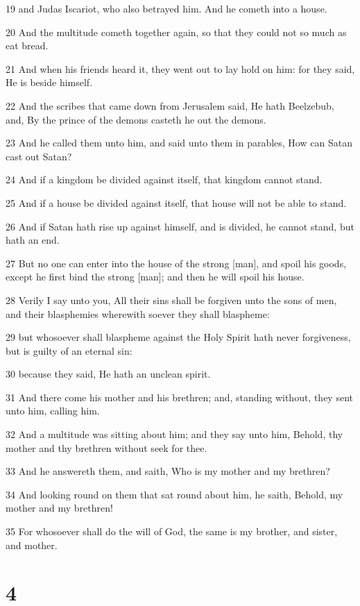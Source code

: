 \par 19 and Judas Iscariot, who also betrayed him. And he cometh into a house.
\par 20 And the multitude cometh together again, so that they could not so much as eat bread.
\par 21 And when his friends heard it, they went out to lay hold on him: for they said, He is beside himself.
\par 22 And the scribes that came down from Jerusalem said, He hath Beelzebub, and, By the prince of the demons casteth he out the demons.
\par 23 And he called them unto him, and said unto them in parables, How can Satan cast out Satan?
\par 24 And if a kingdom be divided against itself, that kingdom cannot stand.
\par 25 And if a house be divided against itself, that house will not be able to stand.
\par 26 And if Satan hath rise up against himself, and is divided, he cannot stand, but hath an end.
\par 27 But no one can enter into the house of the strong [man], and spoil his goods, except he first bind the strong [man]; and then he will spoil his house.
\par 28 Verily I say unto you, All their sins shall be forgiven unto the sons of men, and their blasphemies wherewith soever they shall blaspheme:
\par 29 but whosoever shall blaspheme against the Holy Spirit hath never forgiveness, but is guilty of an eternal sin:
\par 30 because they said, He hath an unclean spirit.
\par 31 And there come his mother and his brethren; and, standing without, they sent unto him, calling him.
\par 32 And a multitude was sitting about him; and they say unto him, Behold, thy mother and thy brethren without seek for thee.
\par 33 And he answereth them, and saith, Who is my mother and my brethren?
\par 34 And looking round on them that sat round about him, he saith, Behold, my mother and my brethren!
\par 35 For whosoever shall do the will of God, the same is my brother, and sister, and mother.

\chapter{4}

